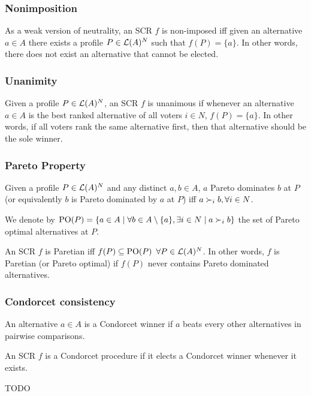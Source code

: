 	\subsubsection{Nonimposition}
	\vspace{-0.6em}
	As a weak version of neutrality, an \acs{SCR} $f$ is non-imposed iff given an alternative $a \in A$ there exists a profile $P\in\mathcal{L}(A)^{N}$ such that $f(P)=\{a\}$. In other words, there does not exist an alternative that cannot be elected.
	
	\subsubsection{Unanimity}
	\vspace{-0.6em}
	Given a profile $P\in\mathcal{L}(A)^{N}$, an \acs{SCR} $f$ is unanimous if whenever an alternative $a \in A$ is the best ranked alternative of all voters $i \in N$, $f(P)=\{a\}$. In other words, if all voters rank the same alternative first, then that alternative should be the sole winner.
	
	\subsubsection{Pareto Property}
	\vspace{-0.6em}
	Given a profile $P\in\mathcal{L}(A)^{N}$ and any distinct $a,b\in A$, $a$ Pareto dominates $b$ at $P$ (or equivalently $b$ is Pareto dominated by $a$ at $P$) iff $a \prefi b,\forall i\in N$.
	
	We denote by $\paretopt(P)= \set{a \in A \suchthat \forall b \in A\setminus\{a\}, \exists i \in N \suchthat a \pref_i b}$ the set of Pareto optimal alternatives at $P$.
	
	An \acs{SCR} $f$ is Paretian iff $f(P)\subseteq\text{PO}(P)$ $\forall P\in\mathcal{L}(A)^{N}$. In other words, $f$ is Paretian (or Pareto optimal) if $f(P)$ never contains Pareto dominated alternatives.
	
	\subsubsection{Condorcet consistency}
	\vspace{-0.6em}
	An alternative $a\in A$ is a Condorcet winner if $a$ beats every other alternatives in pairwise comparisons.
	 
	An \acs{SCR} $f$ is a Condorcet procedure if it elects a Condorcet winner whenever it exists.

%	
%	
%	
\vspace{2em}
TODO	
